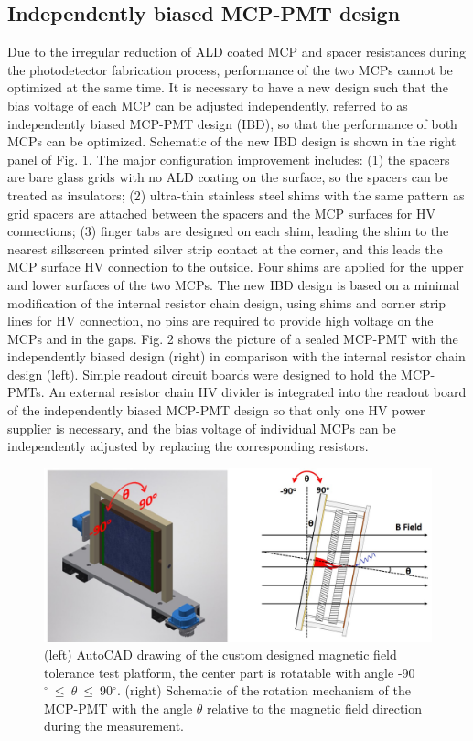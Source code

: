 ﻿\documentclass[preprint,5p]{elsarticle}
\begin{document}
\subsection{Independently biased MCP-PMT design} \label{sec_design}
Due to the irregular reduction of ALD coated MCP and spacer resistances during 
the photodetector fabrication process, performance of the two MCPs cannot be 
optimized at the same time. It is necessary to have a new design such that the bias 
voltage of each MCP can be adjusted independently, referred to as independently 
biased MCP-PMT design (IBD), so that the performance of both MCPs can be optimized.  
Schematic of the new IBD design is shown in the right panel of Fig. 1. The 
major configuration improvement includes: (1) the spacers are bare glass grids with
no ALD coating on the surface, so the spacers can be treated as 
insulators; (2) ultra-thin stainless steel shims with the same pattern as grid 
spacers are attached between the spacers and the MCP surfaces for HV 
connections; (3) finger tabs are designed on each shim, leading the shim to the 
nearest silkscreen printed silver strip contact at the corner, and this leads the MCP 
surface HV connection to the outside. Four shims are applied for the upper and 
lower surfaces of the two MCPs. The new IBD design is based on a minimal 
modification of the internal resistor chain design, using shims and corner 
strip lines for HV connection, no pins are required to provide high voltage on 
the MCPs and in the gaps. Fig. 2 shows the picture of a sealed MCP-PMT with the 
independently biased design (right) in comparison with the internal resistor 
chain design (left). Simple readout circuit boards were designed to hold the 
MCP-PMTs. An external resistor chain HV divider is integrated into the readout 
board of the independently biased MCP-PMT design so that only one HV power 
supplier is necessary, and the bias voltage of individual MCPs can be 
independently adjusted by replacing the corresponding resistors. 

\begin{figure}[tbp]
\centering \includegraphics[scale=0.6]{fig/Figure3.jpg}
\caption{(left) AutoCAD drawing of the custom designed magnetic field tolerance 
   test platform, the center part is rotatable with angle 
   -90$^{\circ}~\leq~\theta~\leq~$90$^{\circ}$.  (right) Schematic of the 
   rotation mechanism of the MCP-PMT with the angle $\theta$ relative to the 
   magnetic field direction during the measurement. } \label{fig:design}
\end{figure}
\end{document}
